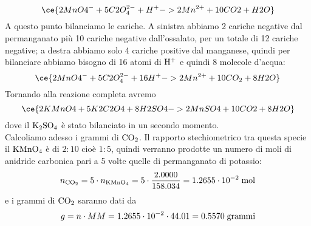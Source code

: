\begin{soluzione}
\begin{equation*}
        \ce{2MnO4^- + 5C2O_4^{2-} + H^+ -> 2Mn^{2+} + 10CO2 + H2O}
    \end{equation*}
    A questo punto bilanciamo le cariche. A sinistra abbiamo 2 cariche negative dal permanganato più 10 cariche negative dall'ossalato, per un totale di 12 cariche negative; a destra abbiamo solo 4 cariche positive dal manganese, quindi per bilanciare abbiamo bisogno di 16 atomi di $\rm H^+$ e quindi 8 molecole d'acqua:
    \begin{equation*}
        \ce{2MnO4^- + 5C2O_4^{2-} + 16H^+ -> 2Mn^{2+} + 10CO_2 + 8H2O}
    \end{equation*}
    Tornando alla reazione completa avremo
    \begin{equation*}
        \ce{2KMnO4 + 5K2C2O4 + 8H2SO4 -> 2MnSO4 + 10CO2 + 8H2O}
    \end{equation*}
    dove il $\rm K_2SO_4$ è stato bilanciato in un secondo momento.\\
    Calcoliamo adesso i grammi di $\rm CO_2$. Il rapporto stechiometrico tra questa specie il $\rm KMnO_4$ è di $2:10$ cioè $1:5$, quindi verranno prodotte un numero di moli di anidride carbonica pari a 5 volte quelle di permanganato di potassio:
    \begin{equation*}
        n_{\rm CO_2}
        =5 \cdot n_{\rm KMnO_4}
        =5 \cdot \frac{2.0000}{158.034}
        =1.2655 \cdot 10^{-2} \; \rm mol
    \end{equation*}
    e i grammi di $\rm CO_2$ saranno dati da
    \begin{equation*}
        g
        =n \cdot MM=1.2655 \cdot 10^{-2} \cdot 44.01
        =0.5570 \; \rm grammi
    \end{equation*}
\end{soluzione}

\newpage

